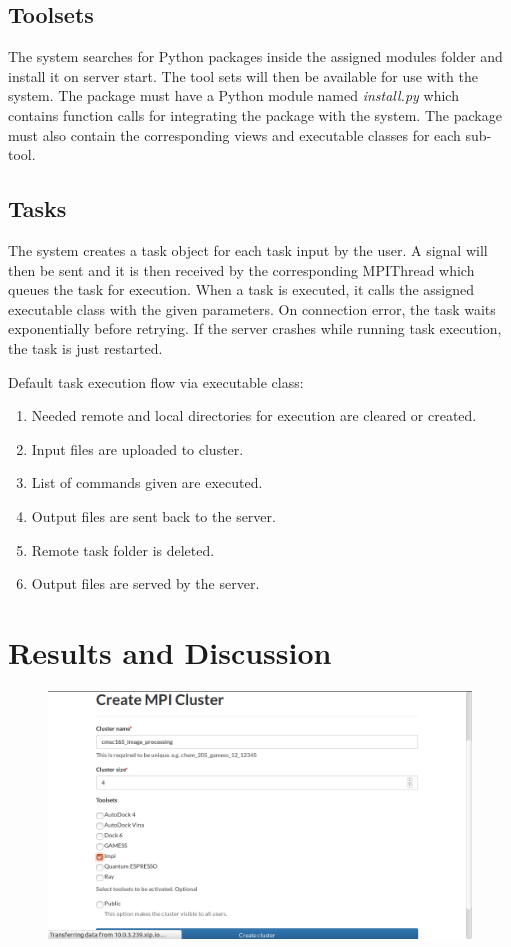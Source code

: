 \subsection{Toolsets} 
The system searches for Python packages inside the assigned modules folder and install it on server start. The tool sets will then be available for use with the system. The package must have a Python module named \emph{install.py} which contains function calls for integrating the package with the system. The package must also contain the corresponding views and executable classes for each sub-tool.  

\subsection{Tasks} 
The system creates a task object for each task input by the user. A signal will then be sent and it is then received by the corresponding MPIThread which queues the task for execution. When a task is executed, it calls the assigned executable class with the given parameters. On connection error, the task waits exponentially before retrying. If the server crashes while running task execution, the task is just restarted.				
		
Default task execution flow via executable class:			
	\begin{enumerate}
		\item  Needed remote and local directories for execution are cleared or created.
		\item  Input files are uploaded to cluster.
		\item  List of commands given are executed.
		\item  Output files are sent back to the server.
		\item  Remote task folder is deleted.
		\item  Output files are served by the server.
	\end{enumerate}	

	
\section{Results and Discussion}
		
\begin{figure}			
	\includegraphics[scale=0.93]{./images/n_create_cluster_impi_printed.png}
\end{figure}	
	

